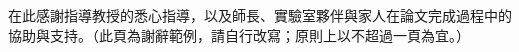 \begin{acknowledgements}
在此感謝指導教授的悉心指導，以及師長、實驗室夥伴與家人在論文完成過程中的
協助與支持。（此頁為謝辭範例，請自行改寫；原則上以不超過一頁為宜。）
\end{acknowledgements}
